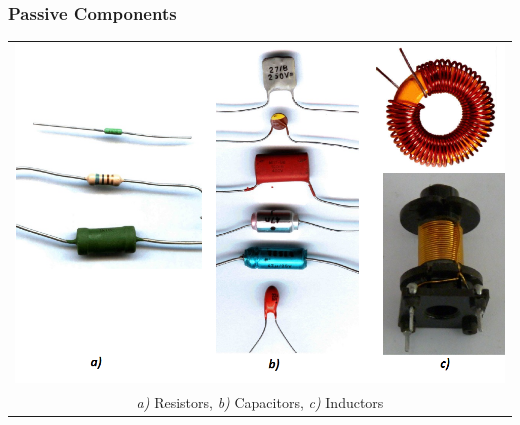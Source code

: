 \documentclass{beamer}
\begin{document}
	\begin{frame}
    \frametitle{Passive Components}
		\begin{center}
		\begin{tabular}{c}
			\includegraphics[width=0.8\linewidth]{obr01_RLC.png}\\
			\small{\textit{a)} Resistors, \textit{b)} Capacitors, \textit{c)} Inductors}
		\end{tabular}
		\end{center}
  \end{frame}
\end{document}
